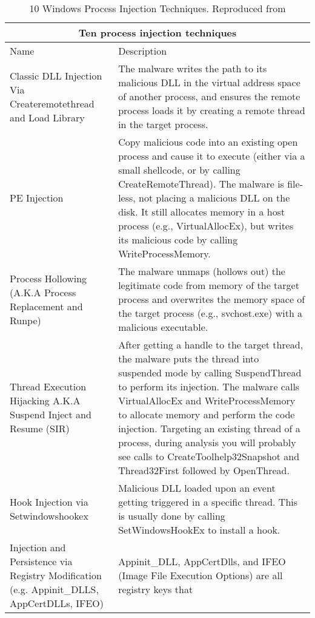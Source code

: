 \begin{table}[!ht]
\centering
\caption{10 Windows Process Injection Techniques. Reproduced from \autocite{Hosseini:2017}}
\begin{tabular}{ |p{3.5cm}||p{10.5cm}|  }
  \hline
  \multicolumn{2}{|c|}{Ten process injection techniques} \\
  \hline
  Name & Description \\
  \hline
  Classic DLL Injection Via Createremotethread and Load Library
             & The malware writes the path to its malicious DLL in the virtual address space of another process,
               and ensures the remote process loads it by creating a remote thread in the target process. \\
  \hline
  PE Injection
             & Copy malicious code into an existing open process and cause it to execute (either via a
               small shellcode, or by calling CreateRemoteThread). The malware is file-less, not placing a malicious DLL
               on the disk.  It still allocates memory in a host process (e.g., VirtualAllocEx),
               but writes its malicious code by calling WriteProcessMemory. \\
  \hline
  Process Hollowing (A.K.A Process Replacement and Runpe)
             & The malware unmaps (hollows out) the legitimate code from memory of the target process and
               overwrites the memory space of the target process (e.g., svchost.exe) with a malicious executable.\\
  \hline
  Thread Execution Hijacking A.K.A Suspend Inject and Resume (SIR)
             & After getting a handle to the target thread, the malware puts the thread into suspended mode by
               calling SuspendThread to perform its injection. The malware calls VirtualAllocEx and
               WriteProcessMemory to allocate memory and perform the code injection. Targeting an existing thread
               of a process, during analysis you will probably see calls to CreateToolhelp32Snapshot and
               Thread32First followed by OpenThread. \\
  \hline
  Hook Injection via Setwindowshookex
             & Malicious DLL loaded upon an event getting triggered in a specific thread. This is usually
               done by calling SetWindowsHookEx to install a hook. \\
  \hline
  Injection and Persistence via Registry Modification (e.g. Appinit\_DLLS, AppCertDLLs, IFEO)
             & Appinit\_DLL, AppCertDlls, and IFEO (Image File Execution Options) are all registry keys that

\end{tabular}
\end{table}

